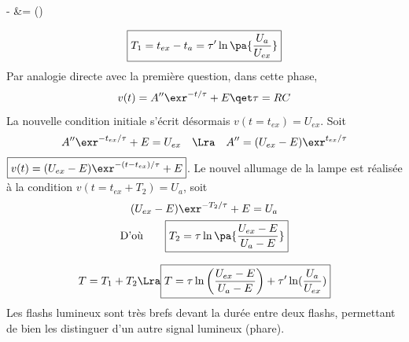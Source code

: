 \documentclass[a4paper, 10pt, garamond, oneside]{book}
\begin{document}
{\begin{enumerate}
\begin{DispWithArrows*}
            - &= \ln ()
            \\\Lra
		      \end{DispWithArrows*}
          \[
			      \boxed{
			      T_1 =
			      t_{ex}-t_{a} =
			      \tau' \ln\pa{\frac{U_{a}}{U_{ex}}}}
		      \]
     Par analogie directe avec la première question, dans cette phase,
		      \[
			      v(t) = A'' \exr^{-t/\tau} +E \qet \tau = RC
		      \]
		      \noindent
		      La nouvelle condition initiale s'écrit désormais
          $v(t=t_{ex}) = U_{ex}$. Soit
		      \[
			      A'' \exr^{-t_{ex}/\tau} + E = U_{ex}
            \quad \Lra \quad
            A'' = (U_{ex}-E) \exr^{t_{ex}/\tau}
		      \]
          {$\boxed{v(t) = (U_{ex}-E)\exr^{-(t-t_{ex})/\tau} + E}$}.
          \smallbreak
          Le nouvel allumage de la lampe est réalisée à la condition
          $v(t = t_{ex} + T_2) = U_{a}$, soit
		      \begin{gather*}
			      (U_{ex}-E)\exr^{-T_2/\tau} + E = U_{a}
            \\
			      \text{D'où}\qquad
			      \boxed{T_2 = \tau \ln\pa{\frac{U_{ex}-E}{U_{a}-E}}}
		      \end{gather*}

     \[
			      T = T_1+T_2
            \Lra
            \boxed{
              T =
              \tau \ln\left(\frac{U_{ex}-E}{U_{a}-E}\right) +
              \tau' \ln(\frac{U_{a}}{U_{ex}})}
		        \]
          Les flashs lumineux sont très brefs devant la durée entre deux flashs,
          permettant de bien les distinguer d'un autre signal lumineux (phare).
	\end{enumerate}
}

\newpage

\end{document}
